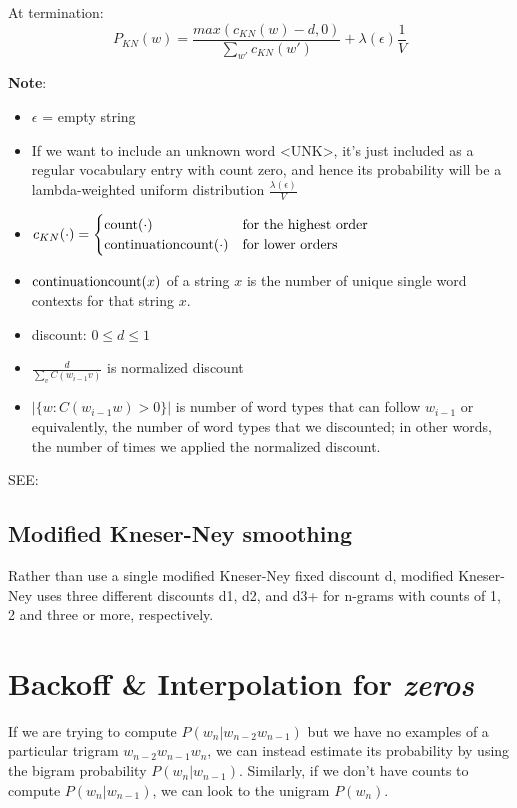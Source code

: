 At termination:
\[
    P_{KN}(w) = \displaystyle\frac{max(c_{KN}(w)-d,0)}{\sum_{w'} c_{KN}(w')} + \lambda(\epsilon)\displaystyle\frac{1}{V}
\]

\textbf{Note}:

\begin{itemize}[itemsep=0.1cm]
    \item $\epsilon$ = empty string
    \item If we want to include an unknown word <UNK>, it’s just included as a regular vocabulary entry with count zero, and hence its probability will be a lambda-weighted uniform distribution \(\displaystyle\frac{\lambda(\epsilon)}{V}\)
    \item \(c_{KN}(\cdot) = \begin{cases}
        \operatorname{count}(\cdot) & \text{for the highest order} \\
        \operatorname{continuationcount}(\cdot) & \text{for lower orders}
    \end{cases}\)
    \item $\operatorname{continuationcount}(x)$ of a string $x$ is the number of unique single word contexts for that string $x$.
    \item discount: $0 \leq d \leq 1$ 
    \item \(\displaystyle\frac{d}{\sum_v C(w_{i-1}v)}\) is normalized discount
    \item \(|\{w : C(w_{i-1}w) > 0\}|\) is number of word types that can follow $w_{i-1}$ or equivalently, the number of word types that we discounted; in other words, the number of times we applied the normalized discount.
\end{itemize}

\vspace{0.2cm}

SEE: 

\subsection{Modified Kneser-Ney smoothing}
Rather than use a single modified
Kneser-Ney fixed discount d, modified Kneser-Ney uses three different discounts d1, d2, and d3+ for n-grams with counts of 1, 2 and three or more, respectively.

\section{Backoff \& Interpolation for \textit{zeros} \cite{nlp-1}}
If we are trying to compute $P(w_n|w_{n-2}w_{n-1})$ but we have no examples of a particular trigram $w_{n-2}w_{n-1}w_n$, we can instead estimate its probability by using the bigram probability $P(w_n|w_{n-1})$. Similarly, if we don’t have counts to compute $P(w_n|w_{n-1})$, we can look to the unigram $P(w_n)$.

